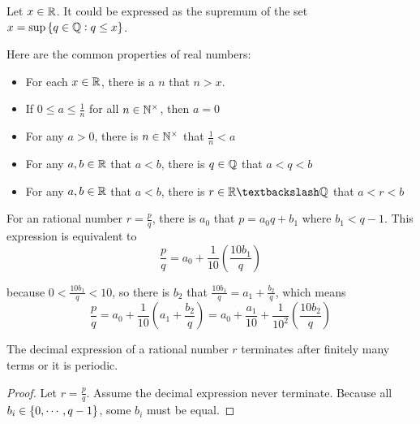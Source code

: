 \begin{theorem}
Let $x \in \mathbb{R}$. It could be expressed as the supremum of the set $x = \sup \set{q \in \mathbb{Q}: q \leq x}$.
\end{theorem}



\begin{theorem}
    Here are the common properties of real numbers:
    \begin{itemize}
        \item For each $x \in \mathbb{R}$, there is a $n$ that $n > x$.
        \item If $\displaystyle 0 \leq a \leq \frac{1}{n}$ for all $n \in \mathbb{N}^{\times}$, then $a = 0$
        \item For any $a >0$, there is $n \in \mathbb{N}^{\times}$ that $\displaystyle \frac{1}{n} < a$
        \item For any $a,b\in \mathbb{R}$ that $a < b$, there is $q \in \mathbb{Q}$ that $a < q < b$
        \item For any $a,b\in \mathbb{R}$ that $a < b$, there is $r \in \realnumber \textbackslash \rational $ that $a < r < b$
    \end{itemize}    
\end{theorem}


\begin{example}
    For an rational number $r = \frac{p}{q}$, there is $a_0$ that $p = a_0 q + b_1$ where $b_1 < q-1$. This expression is equivalent to 
    \begin{equation}
        \frac{p}{q} = a_0 + \frac{1}{10} \left(\frac{10 b_1}{q} \right)
    \end{equation}
    
    because $0 < \frac{10 b_1}{q} < 10$, so there is $b_2$ that $\frac{10 b_1}{q} = a_1 + \frac{b_2}{q}$, which means
    \begin{equation}
        \frac{p}{q} = a_0 + \frac{1}{10} \left( a_1 + \frac{b_2}{q} \right) = a_0 + \frac{a_1}{10} + \frac{1}{10^2} \left(\frac{10 b_2}{q} \right)
    \end{equation}
\end{example}

\begin{theorem}
    The decimal expression of a rational number $r$ terminates after finitely many terms or it is periodic.    
\end{theorem}
\begin{proof}
    Let $r = \frac{p}{q}$. Assume the decimal expression never terminate. Because all $b_i \in \set{0, \cdots, q -1}$, some $b_i$ must be equal.
\end{proof}





